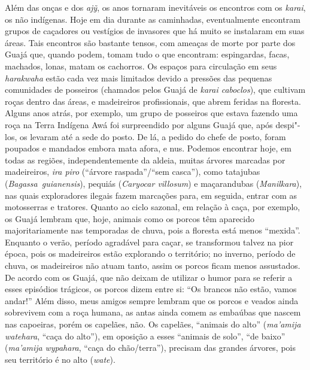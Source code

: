 Além das onças e dos \emph{ajỹ}, os anos tornaram inevitáveis os
encontros com os \emph{karai}, os não indígenas. Hoje em dia durante as
caminhadas, eventualmente encontram grupos de caçadores ou vestígios de
invasores que há muito se instalaram em suas áreas. Tais encontros são
bastante tensos, com ameaças de morte por parte dos Guajá que, quando
podem, tomam tudo o que encontram: espingardas, facas, machados, lonas,
matam os cachorros. Os
espaços para circulação em seus \emph{harakwaha} estão cada vez mais
limitados devido a pressões das pequenas comunidades de posseiros
(chamados pelos Guajá de \emph{karai caboclos}), que cultivam roças
dentro das áreas, e madeireiros profissionais, que abrem feridas na
floresta. Alguns anos atrás, por exemplo, um grupo de posseiros que
estava fazendo uma roça na Terra Indígena Awá foi surpreendido
por alguns Guajá que, após despi"-los, os levaram até a sede do posto. De
lá, a pedido do chefe de posto, foram poupados e mandados embora mata
afora, e nus. Podemos encontrar hoje, em todas as regiões,
independentemente da aldeia, muitas árvores marcadas por madeireiros,
\emph{ira piro} (``árvore raspada''/``sem casca''), como tatajubas
(\emph{Bagassa~guianensis}), pequiás (\emph{Caryocar villosum}) e
maçarandubas (\emph{Manilkara}), nas quais exploradores ilegais fazem
marcações para, em seguida, entrar com as motosserras e tratores. Quanto
ao ciclo sazonal, em relação à caça, por exemplo, os Guajá lembram que,
hoje, animais como os porcos têm aparecido majoritariamente nas
temporadas de chuva, pois a floresta está menos ``mexida''. Enquanto o
verão, período agradável para caçar, se transformou talvez na pior
época, pois os madeireiros estão explorando o território; no inverno,
período de chuva, os madeireiros não atuam tanto, assim os porcos ficam
menos assustados. De acordo com os Guajá, que não deixam de utilizar o
humor para se referir a esses episódios trágicos, os porcos dizem entre
si: ``Os brancos não estão, vamos andar!'' Além disso, meus amigos
sempre lembram que os porcos e veados ainda sobrevivem com a roça
humana, as antas ainda comem as embaúbas que nascem nas capoeiras, porém
os capelães, não. Os capelães, ``animais do alto'' (\emph{ma'amija
watehara}, ``caça do alto''), em oposição a esses ``animais de solo'', ``de
baixo'' (\emph{ma'amija} \emph{wypahara}, ``caça do chão/terra''), precisam
das grandes árvores, pois seu território é no alto (\emph{wate}).

